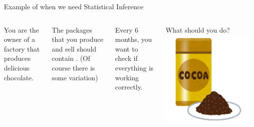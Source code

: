 \begin{frame}{Example of when we need Statistical Inference}
  \begin{columns}
    You are the owner of a factory that produces delicious chocolate.\bigskip

    The packages that you produce and sell should contain . (Of course there is some variation) \bigskip

    Every 6 months, you want to check if everything
    is working correctly.\bigskip

    What should you do?
    \hfill\includegraphics[width=1\textwidth]{../img/irasutoya_cocoa}
  \end{columns}\bigskip
\end{frame}

